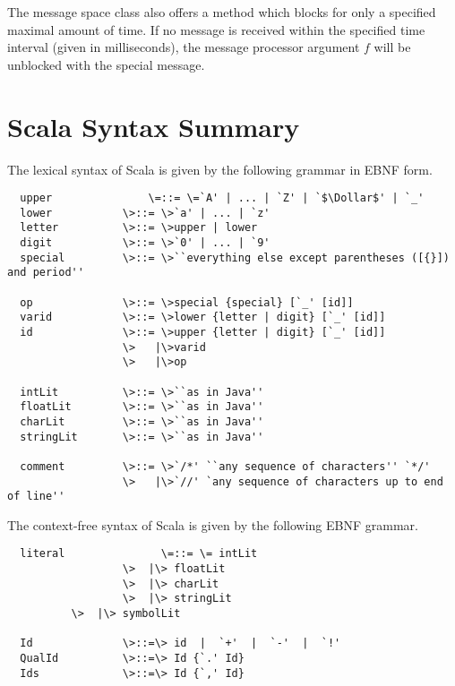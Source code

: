 \documentclass[11pt]{report}
\begin{document}
The message space class also offers a method \verb@receiveWithin@
which blocks for only a specified maximal amount of time.  If no
message is received within the specified time interval (given in
milliseconds), the message processor argument $f$ will be unblocked
with the special \verb@TIMEOUT@ message.

\appendix
\chapter{Scala Syntax Summary}

The lexical syntax of Scala is given by the following grammar in EBNF
form.

\begin{verbatim}
  upper               \=::= \=`A' | ... | `Z' | `$\Dollar$' | `_'
  lower           \>::= \>`a' | ... | `z'
  letter          \>::= \>upper | lower
  digit           \>::= \>`0' | ... | `9'
  special         \>::= \>``everything else except parentheses ([{}]) and period''

  op              \>::= \>special {special} [`_' [id]]
  varid           \>::= \>lower {letter | digit} [`_' [id]]
  id              \>::= \>upper {letter | digit} [`_' [id]]
                  \>   |\>varid
                  \>   |\>op

  intLit          \>::= \>``as in Java''
  floatLit        \>::= \>``as in Java''
  charLit         \>::= \>``as in Java''
  stringLit       \>::= \>``as in Java''

  comment         \>::= \>`/*' ``any sequence of characters'' `*/'
                  \>   |\>`//' `any sequence of characters up to end of line''
\end{verbatim}

The context-free syntax of Scala is given by the following EBNF
grammar.

\begin{verbatim}
  literal               \=::= \= intLit
                  \>  |\> floatLit
                  \>  |\> charLit
                  \>  |\> stringLit
		  \>  |\> symbolLit

  Id              \>::=\> id  |  `+'  |  `-'  |  `!'
  QualId          \>::=\> Id {`.' Id}
  Ids             \>::=\> Id {`,' Id}
\end{verbatim}
\end{document}
